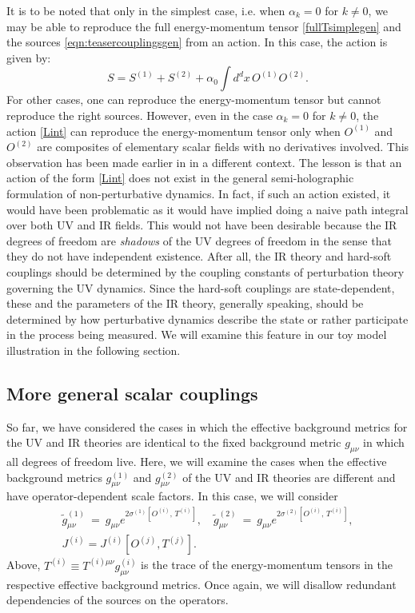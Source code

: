 \documentclass[prd,reprint,a4paper,showpacs,superscriptaddress,11pt,onecolumn,nofootinbib]{revtex4-1}
\newcommand{\be}{\begin{equation}}
\newcommand{\ee}{\end{equation}}
\renewcommand{\(}{\left(}
\renewcommand{\)}{\right)}
\newcommand{\6}{\partial}
\begin{document}
It is to be noted that only in the simplest case, i.e. when $\alpha_k = 0$ for $k\neq 0$, we may be able to reproduce the full energy-momentum tensor \eqref{fullTsimplegen} and the sources \eqref{eqn:teasercouplingsgen} from an action. In this case, the action is given by:
\be
\label{Lint}
S =S^{(1)} + S^{(2)} + \alpha_0 \int d^d x \, O^{(1)}O^{(2)}.
\ee
For other cases, one can reproduce the energy-momentum tensor but cannot reproduce the right sources. However, even in the case $\alpha_k = 0$ for $k\neq 0$, the action \eqref{Lint} can reproduce the energy-momentum tensor only when $O^{(1)}$ and $O^{(2)}$ are composites of elementary scalar fields with no derivatives involved. This observation has been made earlier in \cite{Aharony:2006hz} in a different context. The lesson is that an action of the form \eqref{Lint} does not exist in the general semi-holographic formulation of non-perturbative dynamics. In fact, if such an action existed, it would have been problematic as it would have implied doing a naive path integral over both UV and IR fields. This would not have been desirable because the IR degrees of freedom are \textit{shadows} of the UV degrees of freedom in the sense that they do not have independent existence. After all, the IR theory and hard-soft couplings should be determined by the coupling constants of perturbation theory governing the UV dynamics. Since the hard-soft couplings are state-dependent, these and the parameters of the IR theory, generally speaking, should be determined by how perturbative dynamics describe the state or rather participate in the process being measured. We will examine this feature in our toy model illustration in the following section.





\subsection{More general scalar couplings}\label{sec:scalar-scalar-coupling}
So far, we have considered the cases in which the effective background metrics for the UV and IR theories are identical to the fixed background metric $g_{\mu\nu}$ in which all degrees of freedom live. Here, we will examine the cases when the effective background metrics $g^{(1)}_{\mu\nu}$ and $g^{(2)}_{\mu\nu}$ of the UV and IR theories are different and have operator-dependent scale factors. In this case, we will consider
\begin{eqnarray}\label{eqn:g1g2}
\tilde{g}^{(1)}_{\mu\nu} ~ = ~ g_{\mu\nu}e^{2\sigma^{(1)}\left[O^{(i)}, \, T^{(i)}\right]}, \quad \tilde{g}^{(2)}_{\mu\nu} ~ = ~ g_{\mu\nu}e^{2\sigma^{(2)}\left[O^{(i)}, \, T^{(i)}\right]},\nonumber\\ J^{(i)} = J^{(i)}[O^{(j)}, T^{(j)}].
\end{eqnarray}
Above, $T^{(i)} \equiv T^{(i)\mu\nu} g^{(i)}_{\mu\nu}$ is the trace of the energy-momentum tensors in the respective effective background metrics. Once again, we will disallow redundant dependencies of the sources on the operators.
\end{document}
